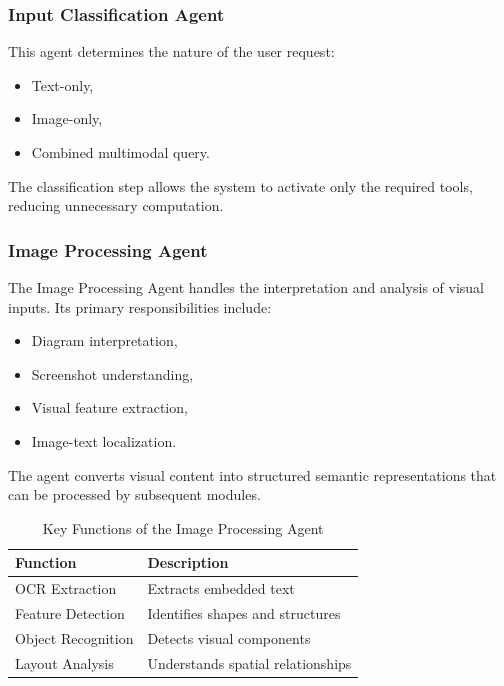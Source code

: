 \documentclass[conference]{IEEEtran}
\begin{document}
\subsubsection{Input Classification Agent}
This agent determines the nature of the user request:
\begin{itemize}
    \item Text-only,
    \item Image-only,
    \item Combined multimodal query.
\end{itemize}
The classification step allows the system to activate only the required tools, reducing unnecessary computation.

\subsubsection{Image Processing Agent}
The Image Processing Agent handles the interpretation and analysis of visual inputs. Its primary responsibilities include:
\begin{itemize}
    \item Diagram interpretation,
    \item Screenshot understanding,
    \item Visual feature extraction,
    \item Image-text localization.
\end{itemize}
The agent converts visual content into structured semantic representations that can be processed by subsequent modules.

\begin{table}[htbp]
\centering
\caption{Key Functions of the Image Processing Agent}
\label{tab:image_functions}
\begin{tabular}{|l|l|}
\hline
\textbf{Function} & \textbf{Description} \\ \hline
OCR Extraction & Extracts embedded text \\ \hline
Feature Detection & Identifies shapes and structures \\ \hline
Object Recognition & Detects visual components \\ \hline
Layout Analysis & Understands spatial relationships \\ \hline
\end{tabular}
\end{table}
\end{document}
